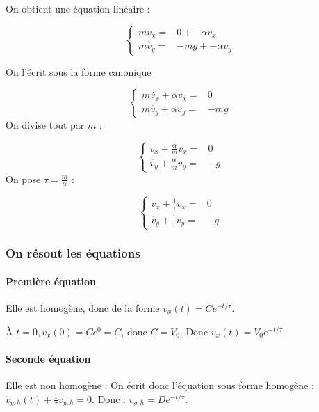 \documentclass[french]{yLectureNote}
\begin{document}
\begin{multicols}{2}
On obtient une équation linéaire :

\[
 \left\{\begin{matrix}
 m\dot{v_x} =& 0 + -\alpha v_x\\
 m\dot{v_y} =& -mg + -\alpha v_y
\end{matrix}\right.
\]

On l'écrit sous la forme canonique

\[
 \left\{\begin{matrix}
 m\dot{v_x} + \alpha v_x =& 0\\
 m\dot{v_y} +\alpha v_y =& -mg
\end{matrix}\right.
\]
\setlength{\columnseprule}{0.4pt}
On divise tout par $m$ :

\[
 \left\{\begin{matrix}
\dot{v_x} +\frac{\alpha}{m} v_x =& 0\\
 \dot{v_y} +\frac{\alpha}{m} v_y =& -g
\end{matrix}\right.
\]
On pose $\tau  = \frac{m}{\alpha}$ :

\[\left\{\begin{matrix}
\dot{v_x} +\frac{1}{\tau} v_x =& 0\\
 \dot{v_y} +\frac{1}{\tau} v_y =& -g
\end{matrix}\right.
\]
\end{multicols}


\subsubsection{On résout les équations}
\paragraph{Première équation}
Elle est homogène, donc de la forme $v_x(t) = Ce^{-t/\tau}$.

À $t=0, v_x(0) = Ce^0 = C$, donc $C = V_0$. Donc $v_x(t) = V_0e^{-t/\tau}$.
\paragraph{Seconde équation}
Elle est non homogène : On écrit donc l'équation sous forme homogène : $\dot{v}_{y,h}(t) + \frac{1}{\tau} v_{y,h} = 0$. Donc : $v_{y,h} = De^{-t/\tau}$.
\end{document}
